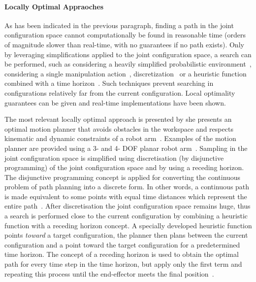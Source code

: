 \paragraph{Locally Optimal Appraoches}
As has been indicated in the previous paragraph, finding a path in the joint configuration space cannot computationally be found in reasonable time (orders of magnitude slower than real-time, with no guarantees if no path exists). Only by leveraging simplifications applied to the joint configuration space, a search can be performed, such as considering a heavily simplified probabilistic environment~\cite{vandenberg_path_2009}, considering a single manipulation action~\cite{berenson_manipulation_2009}, discretization~\cite{sabbaghnovin_optimal_2016} or a heuristic function combined with a time horizon~\cite{sabbaghnovin_optimal_2016}. Such techniques prevent searching in configurations relatively far from the current configuration. Local optimality guarantees can be given and real-time implementations have been shown.\bs

The most relevant locally optimal approach is presented by \citeauthor{sabbaghnovin_model_2021} she presents an optimal motion planner that avoids obstacles in the workspace and respects kinematic and dynamic constraints of a robot arm~\cite{sabbaghnovin_optimal_2016}. Examples of the motion planner are provided using a 3- and 4- \ac{DOF} planar robot arm~\cite{sabbaghnovin_optimal_2016}. Sampling in the joint configuration space is simplified using discretisation (by disjunctive programming) of the joint configuration space and by using a receding horizon. The disjunctive programming concept is applied for converting the continuous problem of path planning into a discrete form. In other words, a continuous path is made equivalent to some points with equal time distances which represent the entire path~\cite{sabbaghnovin_optimal_2016}. After discretisation the joint configuration space remains huge, thus a search is performed close to the current configuration by combining a heuristic function with a receding horizon concept. A specially developed heuristic function points \textit{toward} a target configuration, the planner then plans between the current configuration and a point toward the target configuration for a predetermined time horizon. The concept of a receding horizon is used to obtain the optimal path for every time step in the time horizon, but apply only the first term and repeating this process until the end-effector meets the final position~\cite{sabbaghnovin_optimal_2016}.\bs

